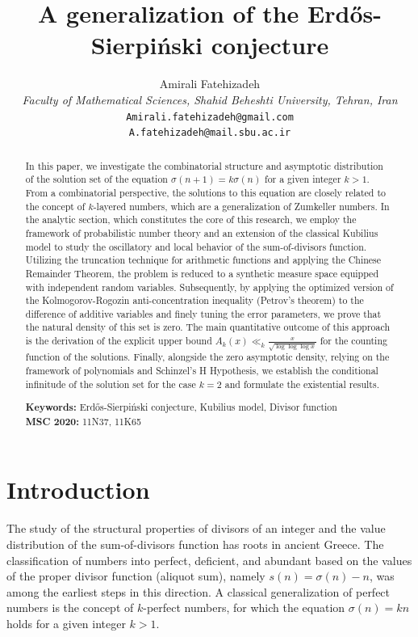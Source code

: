 \documentclass[12pt, a4paper]{article}
\title{\textbf{A generalization of the Erdős-Sierpiński conjecture}}
\author{
    Amirali Fatehizadeh \\
    \small \textit{Faculty of Mathematical Sciences, Shahid Beheshti University, Tehran, Iran} \\
    \small \texttt{Amirali.fatehizadeh@gmail.com} \\
    \small \texttt{A.fatehizadeh@mail.sbu.ac.ir}
}
\date{}
\theoremstyle{plain}
\theoremstyle{definition}
\begin{document}
\sloppy

\maketitle

\begin{abstract}
In this paper, we investigate the combinatorial structure and asymptotic distribution of the solution set of the equation $\sigma(n + 1) = k\sigma(n)$ for a given integer $k > 1$. From a combinatorial perspective, the solutions to this equation are closely related to the concept of $k$-layered numbers, which are a generalization of Zumkeller numbers. In the analytic section, which constitutes the core of this research, we employ the framework of probabilistic number theory and an extension of the classical Kubilius model to study the oscillatory and local behavior of the sum-of-divisors function. Utilizing the truncation technique for arithmetic functions and applying the Chinese Remainder Theorem, the problem is reduced to a synthetic measure space equipped with independent random variables. Subsequently, by applying the optimized version of the Kolmogorov-Rogozin anti-concentration inequality (Petrov's theorem) to the difference of additive variables and finely tuning the error parameters, we prove that the natural density of this set is zero. The main quantitative outcome of this approach is the derivation of the explicit upper bound 
$A_k(x) \ll_k \frac{x}{\sqrt{\log \log \log x}}$
for the counting function of the solutions. Finally, alongside the zero asymptotic density, relying on the framework of polynomials and Schinzel's H Hypothesis, we establish the conditional infinitude of the solution set for the case $k = 2$ and formulate the existential results.

\vspace{1em}
\noindent \textbf{Keywords:} Erdős-Sierpiński conjecture, Kubilius model, Divisor function \\
\textbf{MSC 2020:} 11N37, 11K65
\end{abstract}

\section{Introduction}
The study of the structural properties of divisors of an integer and the value distribution of the sum-of-divisors function has roots in ancient Greece. The classification of numbers into perfect, deficient, and abundant based on the values of the proper divisor function (aliquot sum), namely $s(n) = \sigma(n) - n$, was among the earliest steps in this direction. A classical generalization of perfect numbers is the concept of $k$-perfect numbers, for which the equation $\sigma(n) = kn$ holds for a given integer $k > 1$.
\end{document}
